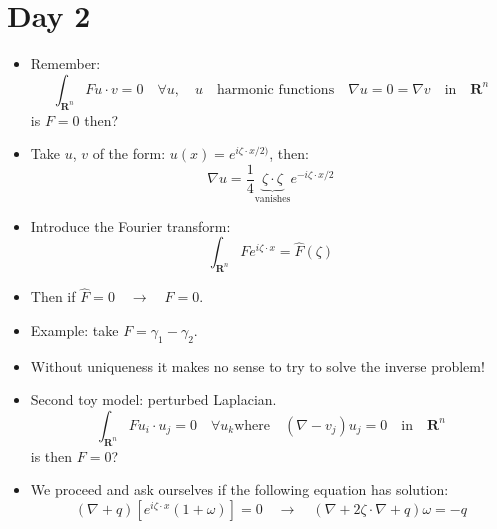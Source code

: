 \documentclass{article}
\begin{document}
\section*{Day 2}
\begin{itemize}
    \item Remember:
    \begin{equation}
        \int_{\mathbf{R}^n} F u \cdot v = 0 
        \quad \forall u, \quad u \quad \text{harmonic functions} \quad \nabla u = 0 = \nabla v \quad \text{in} \quad \mathbf{R}^n
    \end{equation}
    is $F=0$ then?

    \item Take $u$, $v$ of the form: $u(x) = e^{i\zeta \cdot x / 2)}$, then:
    \begin{equation}
        \nabla u = \frac{1}{4} \underbrace{\zeta \cdot \zeta}_{\text{vanishes}} e^{-i\zeta \cdot x /2}
    \end{equation}
    
    \item Introduce the Fourier transform:
    \begin{equation}
        \int_{\mathbf{R}^n} F e^{i\zeta \cdot x} =  \hat{F}(\zeta)
    \end{equation}

    \item Then if $\hat{F} = 0 \quad \rightarrow \quad F = 0$.

    \item Example: take $F = \gamma_1 - \gamma_2$.

    \item Without uniqueness it makes no sense to try to solve the inverse problem!

    \item Second toy model: perturbed Laplacian.
    \begin{equation}
        \int_{\mathbf{R}^n} F u_i \cdot u_j = 0 
        \quad \forall u_k \text{where} \quad (\nabla - v_j) u_j = 0 \quad \text{in} \quad \mathbf{R}^n
    \end{equation}
    is then $F = 0$?
    
    \item We proceed and ask ourselves if the following equation has solution:
    \begin{equation}
        (\nabla + q) [e^{i\zeta \cdot x} (1 + \omega) ] = 0  \quad \rightarrow \quad (\nabla + 2\zeta\cdot\nabla + q)\omega = -q
    \end{equation}


\end{itemize}
\end{document}
